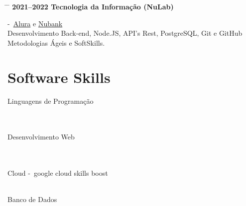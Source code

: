 \documentclass{article}
\begin{document}
\begin{tabbing}
	\hspace{2cm} \= \hspace{4cm} \= \kill
	\bf{2021--2022} \> Tecnologia da Informação (NuLab)

	-~\href{https://www.alura.com.br/}{Alura} e
	\href{https://nubank.com.br/}{Nubank} \\

	Desenvolvimento Back-end, Node.JS, API's Rest, PostgreSQL, Git e GitHub \\
	Metodologias Ágeis e SoftSkills. \\
\end{tabbing}

\section*{Software Skills}

\begin{skillgroup}{Linguagens de Programação}%
	 \\
	 \\
	 \\
\end{skillgroup}

\begin{skillgroup}{Desenvolvimento Web}%
	 \\
	 \\
	 \\
\end{skillgroup}

\begin{skillgroup}{Cloud}%
	 -\ google cloud skills boost\\
	 \\
\end{skillgroup}

\begin{skillgroup}{Banco de Dados}%
	 \\
	 \\
	 \\
	 \\
	 \\
\end{skillgroup}
\end{document}
